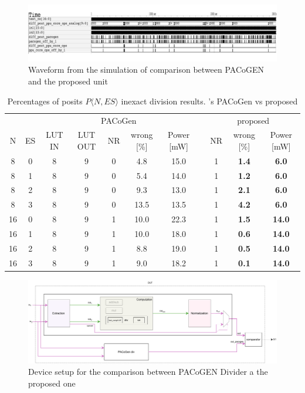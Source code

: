 \begin{figure}
        \includegraphics[width=\textwidth]{figures/waveform_div_against_pacogen.pdf}
        \caption{Waveform from the simulation of comparison between PACoGEN and the proposed unit}
        \label{fig:comparison_against_pacogogen_dut_waveforms}
\end{figure}




\begin{table}
\begin{center}
\begin{savenotes}
\begin{tabular}{ccccccccccc}
    \toprule
     & & \multicolumn{5}{c}{PACoGen} & & \multicolumn{3}{c}{proposed} \\
    \cmidrule{3-7} \cmidrule{9-11}
    N & ES & LUT IN & LUT OUT & NR & wrong [\%] & Power [mW] & & NR & wrong [\%] & Power [mW] \\
    \midrule \midrule
    8 & 0 & 8 & 9 & 0 & 4.8 & 15.0 & & 1 & \textbf{1.4} & \textbf{6.0} \\
    8 & 1 & 8 & 9 & 0 & 5.4 & 14.0 & & 1 & \textbf{1.2} & \textbf{6.0} \\
    8 & 2 & 8 & 9 & 0 & 9.3 & 13.0 & & 1 & \textbf{2.1} & \textbf{6.0} \\
    8 & 3 & 8 & 9 & 0 & 13.5 & 13.5   & & 1 & \textbf{4.2} & \textbf{6.0} \\
    \midrule
    16 & 0 & 8 & 9 & 1 & 10.0 & 22.3 & & 1 & \textbf{1.5} & \textbf{14.0}   \\
    16 & 1 & 8 & 9 & 1 & 10.0 & 18.0 & & 1 & \textbf{0.6} & \textbf{14.0}  \\
    16 & 2 & 8 & 9 & 1 & 8.8 &  19.0 & & 1 & \textbf{0.5} & \textbf{14.0}   \\
    16 & 3 & 8 & 9 & 1 & 9.0 & 18.2 &  & 1 & \textbf{0.1} & \textbf{14.0}  \\
    \bottomrule
\end{tabular}
\end{savenotes}
\caption{Percentages of posits $P\langle N,ES\rangle$ inexact division results. \cite{PACoGen}'s PACoGen vs proposed}
\label{table:comparison_div_against_pacogen_table}
\end{center}
\end{table}


\begin{figure}
        \includegraphics[width=\textwidth]{figures/pacogen_vs_me_dut.pdf}
        \caption{Device setup for the comparison between PACoGEN Divider a the proposed one}
        \label{fig:comparison_against_pacogogen_dut}
\end{figure}